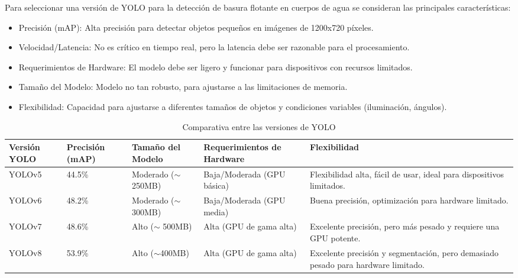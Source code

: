 Para seleccionar una versión de YOLO para la detección de basura flotante en cuerpos de agua se consideran las principales características:

\begin{itemize}
    \item Precisión (mAP): Alta precisión para detectar objetos pequeños en imágenes de 1200x720 píxeles.
    \item Velocidad/Latencia: No es crítico en tiempo real, pero la latencia debe ser razonable para el procesamiento.
    \item Requerimientos de Hardware: El modelo debe ser ligero y funcionar para dispositivos con recursos limitados.
    \item Tamaño del Modelo: Modelo no tan robusto, para ajustarse a las limitaciones de memoria.
    \item Flexibilidad: Capacidad para ajustarse a diferentes tamaños de objetos y condiciones variables (iluminación, ángulos).
\end{itemize}

\begin{table}[H]
\centering
\renewcommand{\arraystretch}{1.5}
\caption{Comparativa entre las versiones de YOLO}
\label{tab:yolo_comparison1}
\begin{tabular}{|p{2cm}|p{2cm}|p{2cm}|p{3cm}|p{3cm}|}
\hline
\textbf{Versión YOLO} & \textbf{Precisión (mAP)} & \textbf{Tamaño del Modelo} & \textbf{Requerimientos de Hardware} & \textbf{Flexibilidad} \\ \hline
YOLOv5       & 44.5\%                  & Moderado ($\sim$ 250MB)          & Baja/Moderada (GPU básica)         & Flexibilidad alta, fácil de usar, ideal para dispositivos limitados. \\ \hline
YOLOv6       & 48.2\%                  & Moderado ($\sim$ 300MB)          & Baja/Moderada (GPU media)          & Buena precisión, optimización para hardware limitado. \\ \hline
YOLOv7       & 48.6\%                  & Alto ($\sim$ 500MB)              & Alta (GPU de gama alta)            & Excelente precisión, pero más pesado y requiere una GPU potente. \\ \hline
YOLOv8       & 53.9\%                  & Alto ($\sim$400MB)              & Alta (GPU de gama alta)            & Excelente precisión y segmentación, pero demasiado pesado para hardware limitado. \\ \hline
\end{tabular}
\end{table}

